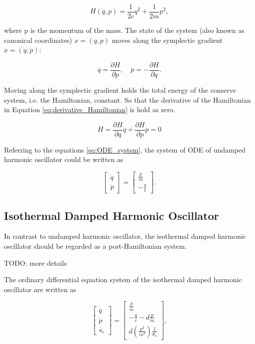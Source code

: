 \documentclass[
	parskip, 			   %
	twoside, 			   %
	DIV=14, 			   %
	BCOR=15.0mm, 		   %
	headsepline, 		   %
	open=right, 		   %
	captions=tableheading, %
	bibliography=totoc,    %
	numbers=noenddot       %
]{scrreprt}
\begin{document}
\begin{equation}
    \label{eq:Hamiltonian_udho}
    H(q,p)=\frac{1}{2c}q^2+\frac{1}{2m}p^2,
\end{equation}

where p is the momentum of the mass. The state of the system (also known as canonical coordinates) $x=(q,p)$ moves along the symplectic gradient $\dot{x}=(\dot{q},\dot{p})$:

\begin{equation}
    \label{eq:symplectic_gradient}
    \dot{q}=\frac{\partial H}{\partial p}, \quad \dot{p}=-\frac{\partial H}{\partial q}.
\end{equation}

Moving along the symplectic gradient holds the total energy of the conserve system, i.e. the Hamiltonian, constant. So that the derivative of the Hamiltonian in Equation \ref{eq:derivative_Hamiltonian} is hold as zero.

\begin{equation}
    \label{eq:derivative_Hamiltonian}
    \dot{H}=\frac{\partial H}{\partial q}\dot{q}+\frac{\partial H}{\partial p}\dot{p}=0
\end{equation}

Referring to the equations \ref{eq:ODE_system}, the system of ODE of undamped harmonic oscillator could be written as

\begin{equation}
    \label{eq:ODE_undamped_harmonic_oscillator}
    \begin{bmatrix}
    \dot{q}\\
    \dot{p}
    \end{bmatrix}
    =
    \begin{bmatrix}
    \frac{p}{m}\\
    -\frac{q}{c}
    \end{bmatrix}.
\end{equation}

\subsection{Isothermal Damped Harmonic Oscillator}
In contrast to undamped harmonic oscillator, the isothermal damped harmonic oscillator should be regarded as a port-Hamiltonian system.

TODO: more details

The ordinary differential equation system of the isothermal damped harmonic oscillator are written as

\begin{equation}
    \label{eq:ODE_isothermal_damped_harmonic_oscillator}
    \begin{bmatrix}
    \dot{q}\\
    \dot{p}\\
    \dot{s_{e}}
    \end{bmatrix}
    =
    \begin{bmatrix}
    \frac{p}{m}\\
    -\frac{q}{c}-d\frac{p}{m}\\
    d(\frac{p^2}{m^2})\frac{1}{\theta_{o}}
    \end{bmatrix},
\end{equation}
\end{document}

